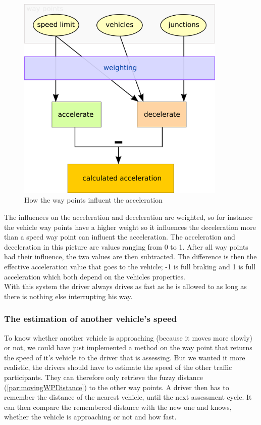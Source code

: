 \begin{figure}[H]
\begin{center}
\includegraphics[width=10cm]{images/animus.png}
\end{center}
\caption{How the way points influent the acceleration}
\label{fig:animus}
\end{figure}

The influences on the acceleration and deceleration are weighted, so for 
instance the vehicle way points have a higher weight so it influences the 
deceleration more than a speed way point can influent the acceleration.
The acceleration and deceleration in this picture are values ranging from
0 to 1. After all way points had their influence, the two values are then
subtracted. The difference is then the effective acceleration value that 
goes to the vehicle; -1 is full braking and 1 is full acceleration which
both depend on the vehicles properties. \\

With this system the driver always drives as fast as he is allowed to
as long as there is nothing else interrupting his way.


\subsubsection{The estimation of another vehicle's speed}

To know whether another vehicle is approaching (because it moves 
more slowly) or not, we could have just implemented a method on the
way point that returns the speed of it's vehicle to the driver that
is assessing. But we wanted it more realistic, the drivers should have
to estimate the speed of the other traffic participants. They can
therefore only retrieve the fuzzy distance (\ref{par:movingWPDistance})
to the other way points. A driver then has to remember the distance
of the nearest vehicle, until the next assessment cycle. It can then
compare the remembered distance with the new one and knows, whether the
vehicle is approaching or not and how fast.

